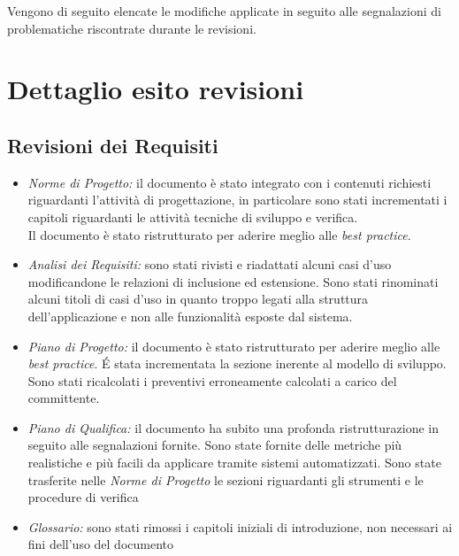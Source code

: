 Vengono di seguito elencate le modifiche applicate in seguito alle segnalazioni di problematiche riscontrate durante le revisioni.

\section{Dettaglio esito revisioni}

\subsection{Revisioni dei Requisiti}
\begin{itemize}
\item \emph{Norme di Progetto: }il documento è stato integrato con i contenuti richiesti riguardanti l'attività di progettazione, in particolare sono stati incrementati i capitoli riguardanti le attività tecniche di sviluppo e verifica.\\
Il documento è stato ristrutturato per aderire meglio alle \emph{best practice}. 

\item \emph{Analisi dei Requisiti: }sono stati rivisti e riadattati alcuni casi d'uso modificandone le relazioni di inclusione ed estensione. Sono stati rinominati alcuni titoli di casi d'uso in quanto troppo legati alla struttura dell'applicazione e non alle funzionalità esposte dal sistema.

\item \emph{Piano di Progetto: }il documento è stato ristrutturato per aderire meglio alle \emph{best practice}. É stata incrementata la sezione inerente al modello di sviluppo. Sono stati ricalcolati i preventivi erroneamente calcolati a carico del committente.

\item \emph{Piano di Qualifica: }il documento ha subito una profonda ristrutturazione in seguito alle segnalazioni fornite. Sono state fornite delle metriche più realistiche e più facili da applicare tramite sistemi automatizzati. Sono state trasferite nelle \emph{Norme di Progetto} le sezioni riguardanti gli strumenti e le procedure di verifica

\item \emph{Glossario: }sono stati rimossi i capitoli iniziali di introduzione, non necessari ai fini dell'uso del documento

\end{itemize}


